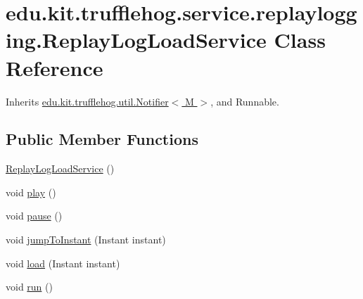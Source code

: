 \hypertarget{classedu_1_1kit_1_1trufflehog_1_1service_1_1replaylogging_1_1_replay_log_load_service}{}\section{edu.\+kit.\+trufflehog.\+service.\+replaylogging.\+Replay\+Log\+Load\+Service Class Reference}
\label{classedu_1_1kit_1_1trufflehog_1_1service_1_1replaylogging_1_1_replay_log_load_service}


Inherits \hyperlink{classedu_1_1kit_1_1trufflehog_1_1util_1_1_notifier}{edu.\+kit.\+trufflehog.\+util.\+Notifier$<$ M $>$}, and Runnable.

\subsection*{Public Member Functions}
\begin{DoxyCompactItemize}
\item 
\hyperlink{classedu_1_1kit_1_1trufflehog_1_1service_1_1replaylogging_1_1_replay_log_load_service_a7aa6163b0d86702cc64bc76b252d8506}{Replay\+Log\+Load\+Service} ()
\item 
void \hyperlink{classedu_1_1kit_1_1trufflehog_1_1service_1_1replaylogging_1_1_replay_log_load_service_a7ee1720d6e1bf1dd3f94a09d3ae7579d}{play} ()
\item 
void \hyperlink{classedu_1_1kit_1_1trufflehog_1_1service_1_1replaylogging_1_1_replay_log_load_service_a34f38fff2e96f71a064a9d47df49e5bc}{pause} ()
\item 
void \hyperlink{classedu_1_1kit_1_1trufflehog_1_1service_1_1replaylogging_1_1_replay_log_load_service_ae1b27ba7e747a0e91ffd19e0e0fc4cfe}{jump\+To\+Instant} (Instant instant)
\item 
void \hyperlink{classedu_1_1kit_1_1trufflehog_1_1service_1_1replaylogging_1_1_replay_log_load_service_a037e283e5597521c9d18df6b0ab3ea07}{load} (Instant instant)
\item 
void \hyperlink{classedu_1_1kit_1_1trufflehog_1_1service_1_1replaylogging_1_1_replay_log_load_service_aa223e6abd2022d6b879cd981562bf40c}{run} ()
\end{DoxyCompactItemize}


